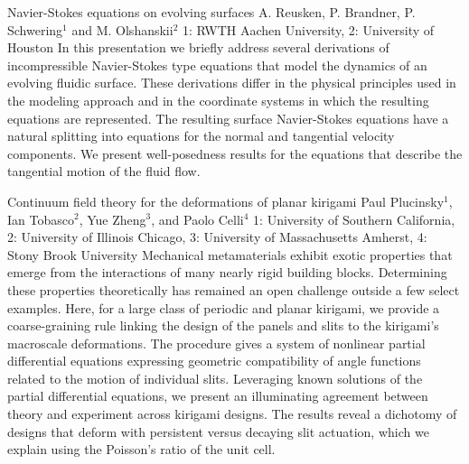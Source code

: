 \begin{addmargin}[2em]{0em}
\vspace{1.5ex}
\abs
{Navier-Stokes equations on evolving surfaces}
{A. Reusken, P. Brandner, P. Schwering$^{1}$ and M. Olshanskii$^{2}$}
{1: RWTH Aachen University, 2: University of Houston}
{In this presentation we briefly address several derivations of incompressible Navier-Stokes type equations that model the dynamics of an evolving fluidic surface. These derivations differ in the physical principles used in the modeling approach and in the coordinate systems in which the resulting equations are represented. The resulting surface Navier-Stokes equations have a natural splitting into equations for the normal and tangential velocity  components. We  present well-posedness results for the equations that describe the tangential motion of the fluid flow.}


\vspace{1.5ex}
\abs
{Continuum field theory for the deformations of planar kirigami}
{Paul Plucinsky$^1$, Ian Tobasco$^2$, Yue Zheng$^3$, and Paolo Celli$^4$}
{1: University of Southern California, 2: University of Illinois Chicago, 3: University of Massachusetts Amherst, 4: Stony Brook University}
{Mechanical metamaterials exhibit exotic properties that emerge from the interactions of many nearly rigid building blocks. Determining these properties theoretically has remained an open challenge outside a few select examples. Here, for a large class of periodic and planar kirigami, we provide a coarse-graining rule linking the design of the panels and slits to the kirigami’s macroscale deformations. The procedure gives a system of nonlinear partial differential equations expressing geometric compatibility of angle functions related to the motion of individual slits. Leveraging known solutions of the partial differential equations, we present an illuminating agreement between theory and experiment across kirigami designs. The results reveal a dichotomy of designs that deform with persistent versus decaying slit actuation, which we explain using the Poisson’s ratio of the unit cell.}



\end{addmargin}
